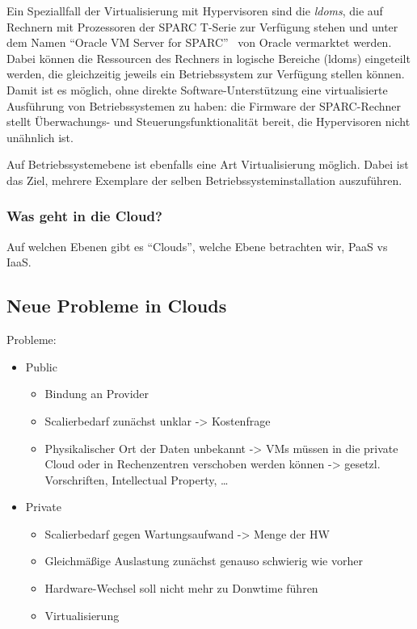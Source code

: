Ein Speziallfall der Virtualisierung mit Hypervisoren sind die
\emph{\acfp{ldom}}, die auf Rechnern mit Prozessoren der SPARC T-Serie
zur Verfügung stehen und unter dem Namen "`Oracle VM Server for
SPARC"'~\cite{Corporation:Oracle-VM-Serve} von Oracle vermarktet
werden. Dabei können die Ressourcen des Rechners in logische Bereiche
(\aclp{ldom}) eingeteilt werden, die gleichzeitig jeweils ein
Betriebssystem zur Verfügung stellen können. Damit ist es möglich,
ohne direkte Software-Unterstützung eine virtualisierte Ausführung
von Betriebssystemen zu haben: die Firmware der SPARC-Rechner stellt
Überwachungs- und Steuerungsfunktionalität bereit, die Hypervisoren
nicht unähnlich ist.

Auf Betriebssystemebene ist ebenfalls eine Art Virtualisierung
möglich. Dabei ist das Ziel, mehrere Exemplare der selben
Betriebssysteminstallation auszuführen.


\subsubsection{Was geht in die Cloud?}
Auf welchen Ebenen gibt es "`Clouds"', welche Ebene betrachten wir,
PaaS vs IaaS.

\subsection{Neue Probleme in Clouds}
Probleme:
\begin{itemize}
\item Public
  \begin{itemize}
  \item Bindung an Provider
  \item Scalierbedarf zunächst unklar -> Kostenfrage
  \item Physikalischer Ort der Daten unbekannt -> VMs müssen in die
    private Cloud oder in Rechenzentren verschoben werden können ->
    gesetzl. Vorschriften, Intellectual Property, \ldots
  \end{itemize}
\item Private
  \begin{itemize}
  \item Scalierbedarf gegen Wartungsaufwand -> Menge der HW
  \item Gleichmäßige Auslastung zunächst genauso schwierig wie vorher
  \item Hardware-Wechsel soll nicht mehr zu Donwtime führen
  \item Virtualisierung 
  \end{itemize}
\end{itemize}

